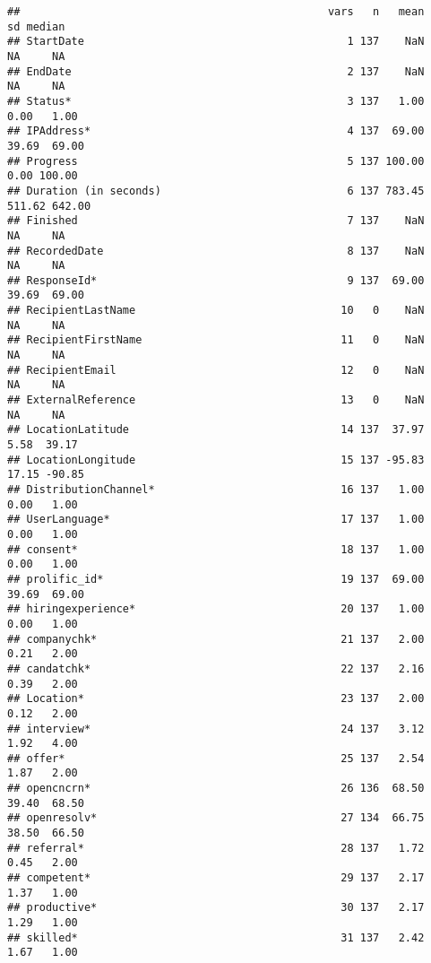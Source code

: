 \documentclass[]{article}
\begin{document}
\begin{verbatim}
##                                                vars   n   mean     sd median
## StartDate                                         1 137    NaN     NA     NA
## EndDate                                           2 137    NaN     NA     NA
## Status*                                           3 137   1.00   0.00   1.00
## IPAddress*                                        4 137  69.00  39.69  69.00
## Progress                                          5 137 100.00   0.00 100.00
## Duration (in seconds)                             6 137 783.45 511.62 642.00
## Finished                                          7 137    NaN     NA     NA
## RecordedDate                                      8 137    NaN     NA     NA
## ResponseId*                                       9 137  69.00  39.69  69.00
## RecipientLastName                                10   0    NaN     NA     NA
## RecipientFirstName                               11   0    NaN     NA     NA
## RecipientEmail                                   12   0    NaN     NA     NA
## ExternalReference                                13   0    NaN     NA     NA
## LocationLatitude                                 14 137  37.97   5.58  39.17
## LocationLongitude                                15 137 -95.83  17.15 -90.85
## DistributionChannel*                             16 137   1.00   0.00   1.00
## UserLanguage*                                    17 137   1.00   0.00   1.00
## consent*                                         18 137   1.00   0.00   1.00
## prolific_id*                                     19 137  69.00  39.69  69.00
## hiringexperience*                                20 137   1.00   0.00   1.00
## companychk*                                      21 137   2.00   0.21   2.00
## candatchk*                                       22 137   2.16   0.39   2.00
## Location*                                        23 137   2.00   0.12   2.00
## interview*                                       24 137   3.12   1.92   4.00
## offer*                                           25 137   2.54   1.87   2.00
## opencncrn*                                       26 136  68.50  39.40  68.50
## openresolv*                                      27 134  66.75  38.50  66.50
## referral*                                        28 137   1.72   0.45   2.00
## competent*                                       29 137   2.17   1.37   1.00
## productive*                                      30 137   2.17   1.29   1.00
## skilled*                                         31 137   2.42   1.67   1.00

\end{verbatim}
\end{document}
